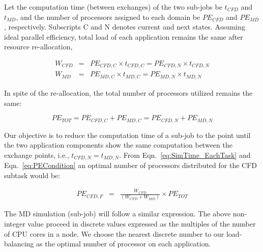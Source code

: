 \documentclass[preprint,12pt]{elsarticle}
\begin{document}
Let the computation time (between exchanges) of the two sub-jobs be $t_{CFD}$ and $t_{MD}$, and the number of processors assigned to each domain be $PE_{CFD}$ and $PE_{MD}$, respectively. Subscripts C and N denotes current and next states. Assuming ideal parallel efficiency, total load of each application remains the same after resource re-allocation,

\vspace{-.2em}
\footnotesize
\begin{eqnarray}
W_{CFD}&=&PE_{CFD,C}\times t_{CFD,C}=PE_{CFD,N}\times t_{CFD,N} \nonumber \\
W_{MD}&=&PE_{MD,C}\times t_{MD,C}=PE_{MD,N}\times t_{MD,N}
\label{eq:SimTime_EachTask}
\end{eqnarray}
\normalsize

In spite of the re-allocation, the total number of processors utilized remains the same:

\vspace{-.2em}
\footnotesize
\begin{equation}
PE_{TOT}=PE_{CFD,C}+PE_{MD,C}=PE_{CFD,N}+PE_{MD,N}
\label{eq:PECondition}
\end{equation}
\normalsize

Our objective is to reduce the computation time of a sub-job to the point until the two application components show the same computation between the exchange points, i.e., $t_{CFD,N} = t_{MD,N}$. From Eqn.~\ref{eq:SimTime_EachTask} and Eqn.~\ref{eq:PECondition} an optimal number of processors distributed for the CFD subtask would be:

\vspace{-.2em}
\footnotesize
\begin{eqnarray}
PE_{CFD,F} & = & \frac {W_{CFD}} {(W_{CFD} + W_{MD})} \times PE_{TOT}
\end{eqnarray}
\normalsize

The MD simulation (sub-job) will follow a similar expression. 
The above non-integer value proceed in discrete values expressed as the multiples of the number of CPU cores in a node. We choose the nearest discrete number to our load-balancing as the optimal number of processor on each application.
\end{document}
